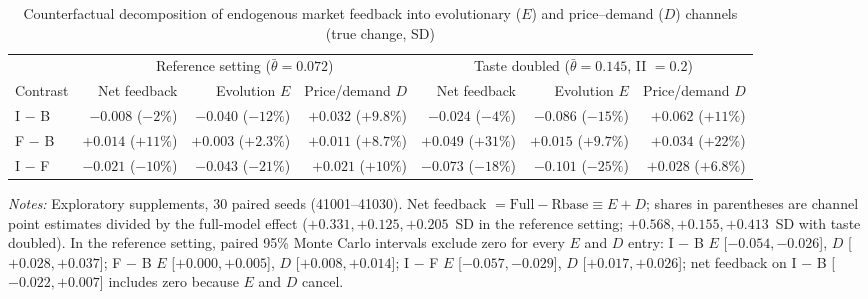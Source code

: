 \documentclass[11pt]{article}
\begin{document}
\begin{table}[t]
\centering
\footnotesize
\begin{threeparttable}
\caption{Counterfactual decomposition of endogenous market feedback into evolutionary ($E$) and price--demand ($D$) channels (true change, SD)}
\label{tab:feedback}
\setlength{\tabcolsep}{4pt}
\begin{tabular}{@{}lrrrrrr@{}}
\toprule
 & \multicolumn{3}{c}{Reference setting ($\bar\theta = 0.072$)} & \multicolumn{3}{c}{Taste doubled ($\bar\theta = 0.145$, II $= 0.2$)} \\
\cmidrule(lr){2-4}\cmidrule(lr){5-7}
Contrast & Net feedback & Evolution $E$ & Price/demand $D$ & Net feedback & Evolution $E$ & Price/demand $D$ \\
\midrule
I $-$ B & $-0.008$ ($-2\%$) & $-0.040$ ($-12\%$) & $+0.032$ ($+9.8\%$) & $-0.024$ ($-4\%$) & $-0.086$ ($-15\%$) & $+0.062$ ($+11\%$) \\
F $-$ B & $+0.014$ ($+11\%$) & $+0.003$ ($+2.3\%$) & $+0.011$ ($+8.7\%$) & $+0.049$ ($+31\%$) & $+0.015$ ($+9.7\%$) & $+0.034$ ($+22\%$) \\
I $-$ F & $-0.021$ ($-10\%$) & $-0.043$ ($-21\%$) & $+0.021$ ($+10\%$) & $-0.073$ ($-18\%$) & $-0.101$ ($-25\%$) & $+0.028$ ($+6.8\%$) \\
\bottomrule
\end{tabular}
\begin{tablenotes}[flushleft]\footnotesize
\item \textit{Notes:} Exploratory supplements, 30 paired seeds (41001--41030). Net feedback $= \text{Full} - \text{Rbase} \equiv E + D$; shares in parentheses are channel point estimates divided by the full-model effect ($+0.331, +0.125, +0.205$~SD in the reference setting; $+0.568, +0.155, +0.413$~SD with taste doubled). In the reference setting, paired 95\% Monte Carlo intervals exclude zero for every $E$ and $D$ entry: I $-$ B $E$ [$-0.054, -0.026$], $D$ [$+0.028, +0.037$]; F $-$ B $E$ [$+0.000, +0.005$], $D$ [$+0.008, +0.014$]; I $-$ F $E$ [$-0.057, -0.029$], $D$ [$+0.017, +0.026$]; net feedback on I $-$ B [$-0.022, +0.007$] includes zero because $E$ and $D$ cancel.
\end{tablenotes}
\end{threeparttable}
\end{table}
\end{document}
